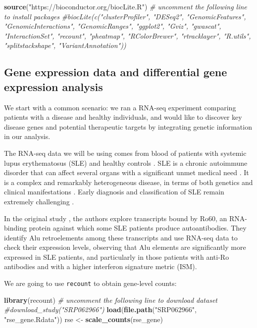 \documentclass[9pt,a4paper,]{extarticle}
\newenvironment{Shaded}{\begin{snugshade}}{\end{snugshade}}
\newcommand{\KeywordTok}[1]{\textcolor[rgb]{0.13,0.29,0.53}{\textbf{#1}}}
\newcommand{\StringTok}[1]{\textcolor[rgb]{0.31,0.60,0.02}{#1}}
\newcommand{\CommentTok}[1]{\textcolor[rgb]{0.56,0.35,0.01}{\textit{#1}}}
\newcommand{\NormalTok}[1]{#1}
\theoremstyle{definition}
\theoremstyle{definition}
\theoremstyle{definition}
\theoremstyle{remark}
\begin{document}
\begin{Shaded}
\begin{Highlighting}[]
\KeywordTok{source}\NormalTok{(}\StringTok{"https://bioconductor.org/biocLite.R"}\NormalTok{)}
\CommentTok{# uncomment the following line to install packages}
\CommentTok{#biocLite(c("clusterProfiler", "DESeq2", "GenomicFeatures", "GenomicInteractions", "GenomicRanges", "ggplot2", "Gviz", "gwascat", "InteractionSet", "recount", "pheatmap", "RColorBrewer", "rtracklayer", "R.utils", "splitstackshape", "VariantAnnotation"))}
\end{Highlighting}
\end{Shaded}

\subsection{Gene expression data and differential gene expression analysis}\label{gene-expression-data-and-differential-gene-expression-analysis}

We start with a common scenario: we ran a RNA-seq experiment comparing patients with a disease and healthy individuals, and would like to discover key disease genes and potential therapeutic targets by integrating genetic information in our analysis.

The RNA-seq data we will be using comes from blood of patients with systemic lupus erythematosus (SLE) and healthy controls \citep{Hung2015}.
SLE is a chronic autoimmune disorder that can affect several organs with a significant unmet medical need \citep{Kaul2016}.
It is a complex and remarkably heterogeneous disease, in terms of both genetics and clinical manifestations \citep{Marion2014}.
Early diagnosis and classification of SLE remain extremely challenging \citep{Amezcua-Guerra2015}.

In the original study \citep{Hung2015}, the authors explore transcripts bound by Ro60, an RNA-binding protein against which some SLE patients produce autoantibodies.
They identify Alu retroelements among these transcripts and use RNA-seq data to check their expression levels, observing that Alu elements are significantly more expressed in SLE patients, and particularly in those patients with anti-Ro antibodies and with a higher interferon signature metric (ISM).

We are going to use \texttt{recount} \citep{Collado-Torres2017} to obtain gene-level counts:

\begin{Shaded}
\begin{Highlighting}[]
\KeywordTok{library}\NormalTok{(recount)}
\CommentTok{# uncomment the following line to download dataset}
\CommentTok{#download_study("SRP062966")}
\KeywordTok{load}\NormalTok{(}\KeywordTok{file.path}\NormalTok{(}\StringTok{"SRP062966"}\NormalTok{, }\StringTok{"rse_gene.Rdata"}\NormalTok{))}
\NormalTok{rse <-}\StringTok{ }\KeywordTok{scale_counts}\NormalTok{(rse_gene)}
\end{Highlighting}
\end{Shaded}
\end{document}
